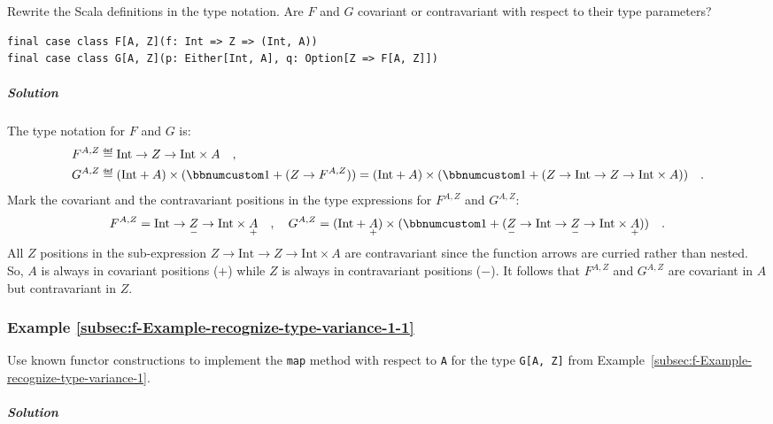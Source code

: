 Rewrite the Scala definitions in the type notation. Are $F$ and $G$
covariant or contravariant with respect to their type parameters?

\begin{lstlisting}
final case class F[A, Z](f: Int => Z => (Int, A))
final case class G[A, Z](p: Either[Int, A], q: Option[Z => F[A, Z]])
\end{lstlisting}


\subparagraph{Solution}

The type notation for $F$ and $G$ is: 
\begin{align*}
 & F^{A,Z}\triangleq\text{Int}\rightarrow Z\rightarrow\text{Int}\times A\quad,\\
 & G^{A,Z}\triangleq(\text{Int}+A)\times(\bbnum 1+(Z\rightarrow F^{A,Z}))=(\text{Int}+A)\times(\bbnum 1+(Z\rightarrow\text{Int}\rightarrow Z\rightarrow\text{Int}\times A))\quad.
\end{align*}
Mark the covariant and the contravariant positions in the type expressions
for $F^{A,Z}$ and $G^{A,Z}$:
\[
F^{A,Z}=\text{Int}\rightarrow\underset{-}{Z}\rightarrow\text{Int}\times\underset{+}{A}\quad,\quad G^{A,Z}=(\text{Int}+\underset{+}{A})\times(\bbnum 1+(\underset{-}{Z}\rightarrow\text{Int}\rightarrow\underset{-}{Z}\rightarrow\text{Int}\times\underset{+}{A}))\quad.
\]
All $Z$ positions in the sub-expression $Z\rightarrow\text{Int}\rightarrow Z\rightarrow\text{Int}\times A$
are contravariant since the function arrows are curried rather than
nested. So, $A$ is always in covariant positions ($+$) while $Z$
is always in contravariant positions ($-$). It follows that $F^{A,Z}$
and $G^{A,Z}$ are covariant in $A$ but contravariant in $Z$. 

\subsubsection{Example \label{subsec:f-Example-recognize-type-variance-1-1}\ref{subsec:f-Example-recognize-type-variance-1-1}}

Use known functor constructions to implement the \lstinline!map!
method with respect to \lstinline!A! for the type \lstinline!G[A, Z]!
from Example~\ref{subsec:f-Example-recognize-type-variance-1}.

\subparagraph{Solution}

